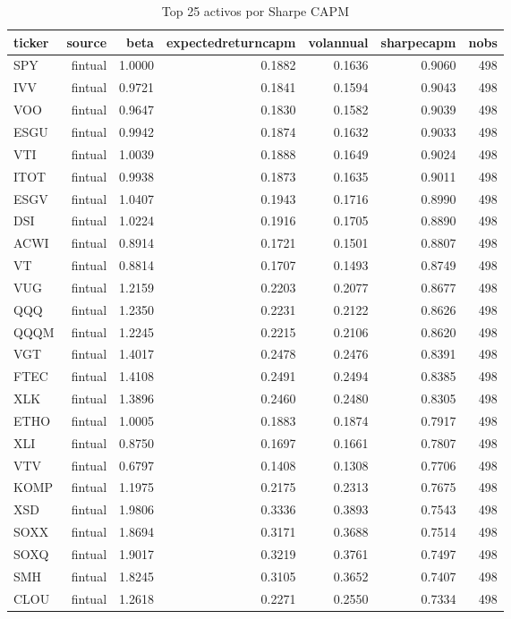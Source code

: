 \begin{table}[htbp]
\centering
\begin{tabular}{lrrrrrr}
\hline
ticker & source & beta & expectedreturncapm & volannual & sharpecapm & nobs \\
\hline
SPY & fintual & 1.0000 & 0.1882 & 0.1636 & 0.9060 & 498 \\
IVV & fintual & 0.9721 & 0.1841 & 0.1594 & 0.9043 & 498 \\
VOO & fintual & 0.9647 & 0.1830 & 0.1582 & 0.9039 & 498 \\
ESGU & fintual & 0.9942 & 0.1874 & 0.1632 & 0.9033 & 498 \\
VTI & fintual & 1.0039 & 0.1888 & 0.1649 & 0.9024 & 498 \\
ITOT & fintual & 0.9938 & 0.1873 & 0.1635 & 0.9011 & 498 \\
ESGV & fintual & 1.0407 & 0.1943 & 0.1716 & 0.8990 & 498 \\
DSI & fintual & 1.0224 & 0.1916 & 0.1705 & 0.8890 & 498 \\
ACWI & fintual & 0.8914 & 0.1721 & 0.1501 & 0.8807 & 498 \\
VT & fintual & 0.8814 & 0.1707 & 0.1493 & 0.8749 & 498 \\
VUG & fintual & 1.2159 & 0.2203 & 0.2077 & 0.8677 & 498 \\
QQQ & fintual & 1.2350 & 0.2231 & 0.2122 & 0.8626 & 498 \\
QQQM & fintual & 1.2245 & 0.2215 & 0.2106 & 0.8620 & 498 \\
VGT & fintual & 1.4017 & 0.2478 & 0.2476 & 0.8391 & 498 \\
FTEC & fintual & 1.4108 & 0.2491 & 0.2494 & 0.8385 & 498 \\
XLK & fintual & 1.3896 & 0.2460 & 0.2480 & 0.8305 & 498 \\
ETHO & fintual & 1.0005 & 0.1883 & 0.1874 & 0.7917 & 498 \\
XLI & fintual & 0.8750 & 0.1697 & 0.1661 & 0.7807 & 498 \\
VTV & fintual & 0.6797 & 0.1408 & 0.1308 & 0.7706 & 498 \\
KOMP & fintual & 1.1975 & 0.2175 & 0.2313 & 0.7675 & 498 \\
XSD & fintual & 1.9806 & 0.3336 & 0.3893 & 0.7543 & 498 \\
SOXX & fintual & 1.8694 & 0.3171 & 0.3688 & 0.7514 & 498 \\
SOXQ & fintual & 1.9017 & 0.3219 & 0.3761 & 0.7497 & 498 \\
SMH & fintual & 1.8245 & 0.3105 & 0.3652 & 0.7407 & 498 \\
CLOU & fintual & 1.2618 & 0.2271 & 0.2550 & 0.7334 & 498 \\
\hline
\end{tabular}
\caption{Top 25 activos por Sharpe CAPM}
\label{tab:capm-top}
\end{table}